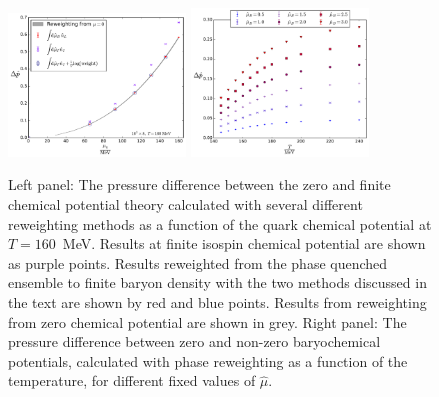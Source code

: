 \documentclass[twocolumn,showpacs,preprintnumbers,amsmath,amssymb,latexsym,prl,footinbib,floatfix,superscriptaddress]{revtex4-2}
\begin{document}
\begin{figure}[t]
  \centering
  \includegraphics[width=0.42\textwidth]{plot4.pdf}
  \includegraphics[width=0.42\textwidth]{plot6.pdf}
  \caption{
      \vspace{-0.02cm}
      Left panel: The pressure difference between the zero and finite chemical potential theory calculated with several different reweighting methods
      as a function of the quark chemical potential at $T=160$~MeV. Results at finite isospin chemical potential are shown as purple points. Results reweighted from the 
      phase quenched ensemble to finite baryon density with the two methods discussed in the text are shown by red and blue points. Results from reweighting 
      from zero chemical potential are shown in grey. Right panel: The pressure difference between zero and non-zero baryochemical potentials, calculated with phase reweighting
      as a function of the temperature, for different fixed values of $\hat{\mu}$.
      \vspace{-0.5cm}
  }
  \label{fig:reweighting_methods}
\end{figure}
\end{document}
